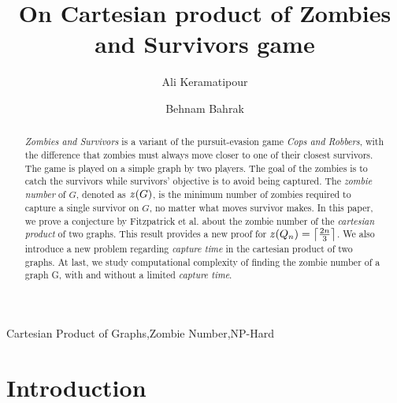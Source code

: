 \documentclass[1p]{elsarticle}
\DeclarePairedDelimiter\ceil{\lceil}{\rceil} \DeclarePairedDelimiter\floor{\lfloor}{\rfloor}
\newcommand{\zn}{\ooalign{$z$\cr\hfil\rule[.5ex]{.2em}{.08ex}\hfil\cr}}
\begin{document}
	
	\begin{frontmatter}
		
		\title{On Cartesian product of Zombies and Survivors game}
		
		
		\author{Ali Keramatipour}
		
		\author{Behnam Bahrak}
		
		\address{School of Electrical and Computer Engineering, College of Engineering, University of Tehran, Tehran, Iran}
		
		\begin{abstract}
		{\it Zombies and Survivors} is a variant of the pursuit-evasion game {\it Cops and Robbers}, with the difference
		that zombies must always move closer to one of their closest survivors. The game is played on a simple graph by
		two players. The goal of the zombies is to catch the survivors while survivors' objective is to avoid being
		captured. The {\it zombie number} of $G$, denoted as $\zn(G)$, is the minimum number of zombies required to
		capture a single survivor on $G$, no matter what moves survivor makes. In this paper, we prove a conjecture by
		Fitzpatrick et al.\cite{Fitz16} about the zombie number of the {\it cartesian product} of two graphs. This
		result provides a new proof for $\zn(Q_n) = \ceil*{\frac{2n}{3}}$. We also introduce a new problem regarding
		{\it capture time} in the cartesian product of two graphs. At last, we study computational complexity of finding the
		zombie number of a graph G, with and without a limited {\it capture time}.
		\end{abstract}
		
		\begin{keyword}
			Cartesian Product of Graphs\sep Zombie Number\sep NP-Hard
		\end{keyword}
		
	\end{frontmatter}
	
\section{Introduction}\label{section-introduction}
\end{document}
